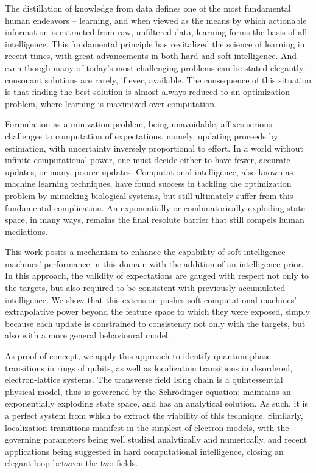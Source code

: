 The distillation of knowledge from data defines one of the most fundamental
human endeavors -- learning, and when viewed as the means by which actionable
information is extracted from raw, unfiltered data, learning forms the basis of
all intelligence. This fundamental principle has revitalized the science of
learning in recent times, with great advancements in both hard and soft
intelligence. And even though many of today's most challenging problems can be
stated elegantly, consonant solutions are rarely, if ever, available. The
consequence of this situation is that finding the best solution is almost
always reduced to an optimization problem, where learning is maximized over
computation. 

Formulation as a minization problem, being unavoidable, affixes serious
challenges to computation of expectations, namely, updating proceeds by
estimation, with uncertainty inversely proportional to effort. In a world
without infinite computational power, one must decide either to have fewer,
accurate updates, or many, poorer updates.  Computational intelligence, also
known as machine learning techniques, have found success in tackling the
optimization problem by mimicking biological systems, but still ultimately
suffer from this fundamental complication.  An exponentially or
combinatorically exploding state space, in many ways, remains the final
resolute barrier that still compels human mediations.

This work posits a mechanism to enhance the capability of soft intelligence
machines' performance in this domain with the addition of an intelligence
prior.  In this approach, the validity of expectations are gauged with respect
not only to the targets, but also required to be consistent with previously
accumulated intelligence. We show that this extension pushes soft computational
machines' extrapolative power beyond the feature space to which they were
exposed, simply because each update is constrained to consistency not only with
the targets, but also with a more general behavioural model.

As proof of concept, we apply this approach to identify quantum phase
transitions in rings of qubits, as well as localization transitions in
disordered, electron-lattice systems. The transverse field Ising chain is a
quintessential physical model, thus is goverened by the Schr\"{o}dinger equation;
maintains an exponentially exploding state space, and has an analytical
solution.  As such, it is a perfect system from which to extract the viability
of this technique. Similarly, localization transitions manifest in the simplest
of electron models, with the governing parameters being well studied
analytically and numerically, and recent applications being suggested in hard
computational intelligence, closing an elegant loop between the two fields.



